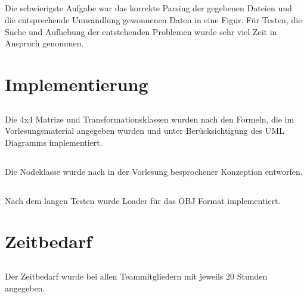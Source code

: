 \documentclass[11pt]{amsart}
\begin{document}
\subsection{}
Die schwierigste Aufgabe war das korrekte Parsing der gegebenen Dateien und die entsprechende Umwandlung gewonnenen Daten in
eine Figur.   
F\"ur Testen, die Suche und Aufhebung der entstehenden Problemen wurde sehr viel Zeit in Anspruch genommen.


\section{Implementierung}
\subsection{}
Die 4x4 Matrize und Transformationsklassen wurden nach den Formeln, die im Vorlesungsmaterial angegeben 
wurden und unter Ber\"ucksichtigung des UML Diagramms implementiert.

\subsection{}
Die Nodeklasse wurde nach in der Vorlesung besprochener Konzeption entworfen. 

\subsection{}
Nach dem langen Testen wurde Loader f\"ur das OBJ Format implementiert. 

\section{Zeitbedarf}
\subsection{}
Der Zeitbedarf wurde bei allen Teammitgliedern mit jeweils 20 Stunden angegeben.
\end{document}
